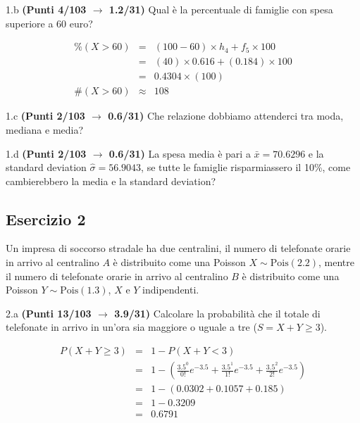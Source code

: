 \documentclass[
  11pt,
]{book}
\theoremstyle{mytheoremstyle}
\theoremstyle{mydefstyle}
\newenvironment{sol}
  {
  \begin{tcolorbox}[enhanced,breakable,arc=0.1mm,boxrule=1pt,colback=white,colframe=iblue,
  title=\bf \fontfamily{lmss}\selectfont \hspace{.5 cm} Soluzione,drop fuzzy shadow]

}{
\end{tcolorbox}
  }
\begin{document}
1.b \textbf{(Punti 4/103 \(\rightarrow\) 1.2/31)} Qual è la percentuale di famiglie con spesa superiore a 60 euro?

\begin{sol}
\begin{eqnarray*}
     \%(X> 60 ) &=& ( 100 - 60 )\times h_{ 4 }+ f_{ 5 }\times 100 \\
              &=& ( 40 )\times 0.616 + ( 0.184 )\times 100 \\
              &=&  0.4304 \times(100)\\
     \#(X> 60 ) &\approx& 108 
         \end{eqnarray*}

\end{sol}

1.c \textbf{(Punti 2/103 \(\rightarrow\) 0.6/31)} Che relazione dobbiamo attenderci tra moda, mediana e media?

1.d \textbf{(Punti 2/103 \(\rightarrow\) 0.6/31)} La spesa media è pari a \(\bar x=70.6296\) e la standard deviation \(\hat\sigma=56.9043\), se tutte le famiglie risparmiassero
il 10\%, come cambierebbero la media e la standard deviation?

\subsection{Esercizio 2}\label{esercizio-2-28}

Un impresa di soccorso stradale ha due centralini, il numero di telefonate orarie in arrivo
al centralino \(A\) è distribuito come una Poisson \(X\sim\text{Pois}(2.2)\), mentre
il numero di telefonate orarie in arrivo al centralino \(B\) è distribuito come una Poisson \(Y\sim\text{Pois}(1.3)\),
\(X\) e \(Y\) indipendenti.

2.a \textbf{(Punti 13/103 \(\rightarrow\) 3.9/31)} Calcolare la probabilità che il totale di telefonate in arrivo in un'ora sia maggiore
o uguale a tre (\(S=X+Y\ge 3\)).

\begin{sol}
\begin{eqnarray*}
   P( X+Y \geq 3 ) &=& 1-P( X+Y < 3 ) \\                 &=& 1-\left( \frac{ 3.5 ^{ 0 }}{ 0 !}e^{- 3.5 }+\frac{ 3.5 ^{ 1 }}{ 1 !}e^{- 3.5 }+\frac{ 3.5 ^{ 2 }}{ 2 !}e^{- 3.5 } \right)\\                 &=& 1-( 0.0302+0.1057+0.185 )\\                 &=& 1- 0.3209 \\                 &=&   0.6791 
\end{eqnarray*}

\end{sol}
\end{document}
